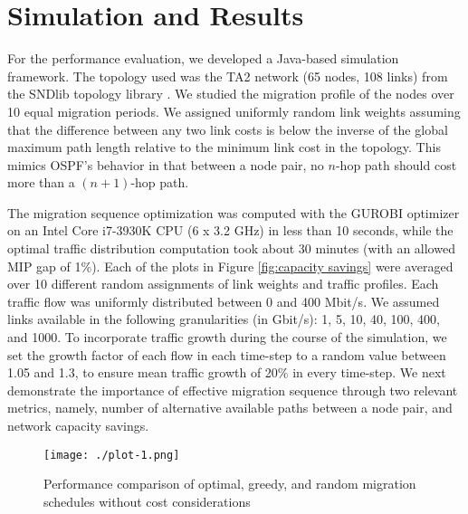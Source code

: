 \documentclass[conference]{IEEEtran}
\begin{document}
\section{Simulation and Results}\label{sec:results}
\par For the performance evaluation, we developed a Java-based simulation
framework. The topology used was the TA2 network (65 nodes, 108 links) from the
SNDlib topology library \cite{sndlib}.
We studied the migration profile of the nodes over 10 equal migration periods. We
assigned uniformly random link weights assuming that the difference between any
two link costs is below the inverse of the global maximum path length relative
to the minimum link cost in the topology. This mimics OSPF's behavior in that
between a node pair, no $n$-hop path should cost more than a $(n+1)$-hop path.

The migration sequence optimization was computed with the GUROBI optimizer on an
Intel Core i7-3930K CPU (6 x 3.2 GHz) in less than 10 seconds, while the optimal
traffic distribution computation took about 30 minutes (with an allowed MIP
gap of 1\%). Each of the plots in Figure \ref{fig:capacity
savings} were averaged over 10 different random assignments of link weights and
traffic profiles. Each traffic flow was uniformly distributed between 0 and 400
Mbit/s. We assumed links available in the following granularities (in Gbit/s):
1, 5, 10, 40, 100, 400, and 1000. To incorporate traffic growth during the
course of the simulation, we set the growth factor of each flow in each
time-step to a random value between 1.05 and 1.3, to ensure mean traffic growth of 20\% in
every time-step. We next demonstrate the importance of effective migration
sequence through two relevant metrics, namely, number of alternative available
paths between a node pair, and network capacity savings.

\begin{figure}
\begin{center}
\texttt{[image: ./plot-1.png]}
\caption{Performance comparison of optimal, greedy, and random migration
schedules without cost considerations}
\label{fig:number of migrated nodes}
\end{center}
\vspace{-7mm}
\end{figure}
\end{document}
